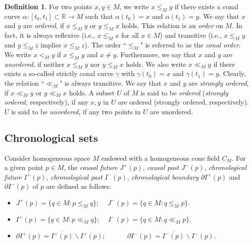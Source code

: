 \documentclass[a4paper,11pt]{article}
\theoremstyle{plain}
\theoremstyle{definition}
\newtheorem{defn}[thm]{Definition}
\numberwithin{equation}{section}
\begin{document}
\begin{defn}\label{def-order}
For two points $x,y \in M$, we write $x\leq_M y$ if there exists a conal curve $\alpha \colon [t_0,t_1] \subset \mathbb{R} \to M$ such that $\alpha(t_0)=x$ and $\alpha(t_1)=y$. We say that $x$ and $y$ are \textit{ordered}, if $x\leq_M y$ or $y\leq_M x$ holds.
This relation is an \textit{order} on $M$. In fact, it is always reflexive (i.e., $x\leq_M x$ for all $x\in M$) and transitive (i.e., $x\leq_M y$ and $y\leq_M z$ implies $x\leq_M z$). The order ``$\leq_M$" is referred to as the \textit{conal order}. We write $x<_M y$ if $x\leq_M y$ and $x\neq y$.
Furthermore, we say that $x$ and $y$ are \textit{unordered}, if neither $x\leq_M y$ nor $y\leq_M x$ holds.
We also write $x\ll_M y$ if there exists a so-called strictly conal curve $\gamma$ with $\gamma(t_0)=x$ and $\gamma(t_1)=y$. Clearly, the relation ``$\ll_M$" is always transitive. We say that $x$ and $y$ are \textit{strongly ordered}, if $x\ll_M y$ or $y\ll_M x$ holds.
A subset $U$ of $M$ is said to be \textit{ordered} (\textit{strongly ordered}, respectively), if any $x,y$ in $U$ are ordered (strongly ordered, respectively). $U$ is said to be \textit{unordered}, if any two points in $U$ are unordered.
\end{defn}



\subsection{Chronological sets}

Consider homogeneous space $M$ endowed with a homogeneous cone field $C_M$. For a given point $p\in M$, the \textit{causal future} $J^+(p)$, \textit{causal past} $J^-(p)$, \textit{chronological future} $I^+(p)$, \textit{chronological past} $I^-(p)$, \textit{chronological boundary} $\partial I^+(p)$ and $\partial I^-(p)$ of $p$ are defined as follows:
\begin{itemize}
	\item  $J^+(p)=\{q\in M \colon p\leq_M q\}$; \ \  $J^-(p)=\{q\in M \colon q\leq_M p\}$.
	
	\item  $I^+(p)=\{q\in M \colon p\ll_M q\}$; \ \  $I^-(p)=\{q\in M \colon q\ll_M p\}$.

    \item $\partial I^+(p)=\overline{I^+(p)}\backslash I^+(p)$; \ \ \ \ \ \  $\partial I^-(p)=\overline{I^-(p)}\backslash I^-(p)$.
\end{itemize}
\end{document}
